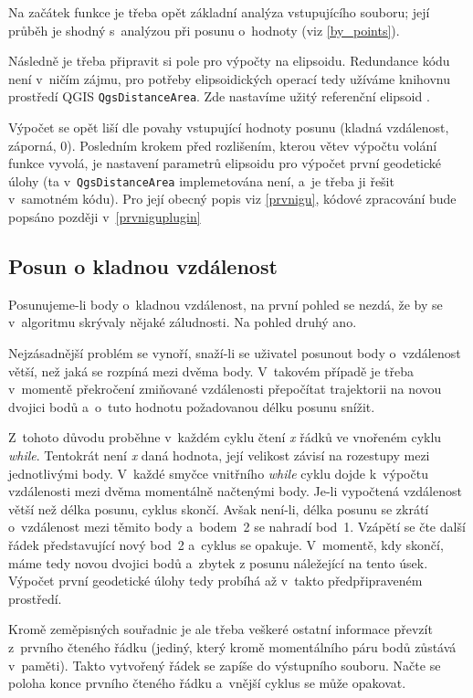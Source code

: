 Na začátek funkce je třeba opět základní analýza vstupujícího souboru; její průběh je shodný
s~analýzou při posunu o~hodnoty (viz \ref{by_points}). 

Následně je třeba připravit si pole pro výpočty na elipsoidu. Redundance kódu není v~ničím
zájmu, pro potřeby elipsoidických operací tedy užíváme knihovnu
prostředí QGIS {\tt QgsDistanceArea}. Zde nastavíme
užitý referenční elipsoid . 

Výpočet se opět liší dle povahy vstupující hodnoty posunu (kladná vzdálenost,
záporná, 0). Posledním krokem před rozlišením, kterou větev výpočtu volání funkce vyvolá, je nastavení
parametrů elipsoidu pro výpočet první geodetické úlohy (ta v~{\tt QgsDistanceArea} implemetována
není, a~je třeba ji řešit v~samotném kódu). Pro její obecný popis viz
\ref{prvnigu}, kódové zpracování bude popsáno později v~\ref{prvniguplugin} 

\subsection{Posun o kladnou vzdálenost}
\label{kladnavzdalenost}

Posunujeme-li body o~kladnou vzdálenost, na první pohled se nezdá, že by se v~algoritmu skrývaly
nějaké záludnosti. Na pohled druhý ano. 

Nejzásadnější problém se vynoří, snaží-li se uživatel posunout body o~vzdálenost větší, než
jaká se rozpíná mezi dvěma body. V~takovém případě je třeba v~momentě překročení zmiňované
vzdálenosti přepočítat trajektorii na novou dvojici bodů a~o~tuto hodnotu požadovanou
délku posunu snížit. 

Z~tohoto důvodu proběhne v~každém cyklu čtení \textit{x} řádků ve vnořeném cyklu \textit{while}.
Tentokrát není \textit{x} daná hodnota, její velikost závisí na rozestupy mezi jednotlivými body.
V~každé smyčce vnitřního \textit{while} cyklu dojde k~výpočtu vzdálenosti mezi dvěma momentálně
načtenými body. Je-li vypočtená vzdálenost větší než délka posunu, cyklus skončí. 
Avšak není-li, délka posunu se zkrátí o~vzdálenost mezi těmito body a~bodem~2 se nahradí bod~1.
Vzápětí se čte další řádek představující nový bod~2 a~cyklus se opakuje. V~momentě, kdy
skončí, máme tedy novou dvojici bodů a~zbytek z posunu náležející na tento úsek.
Výpočet první geodetické úlohy tedy probíhá až v~takto předpřipraveném prostředí. 

Kromě zeměpisných souřadnic je ale třeba veškeré ostatní informace převzít z~prvního
čteného řádku (jediný, který kromě momentálního páru bodů zůstává v~paměti). Takto vytvořený
řádek se zapíše do výstupního souboru. Načte se poloha konce prvního čteného řádku
a~vnější cyklus se může opakovat. 

